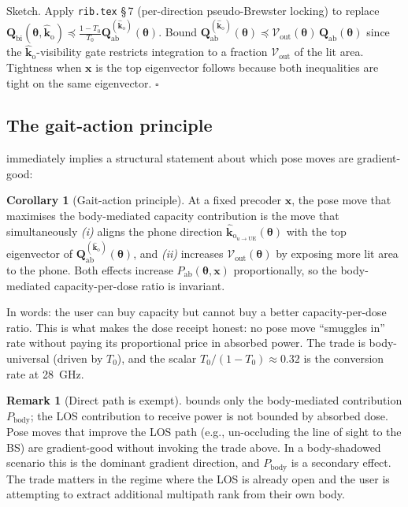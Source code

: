 \documentclass[11pt,a4paper]{article}
\theoremstyle{definition}
\newtheorem{corollary}[corollary]{Corollary}
\newtheorem{remark}[remark]{Remark}
\newcommand{\Qabs}{\mathbf{Q}_{\mathrm{ab}}}
\newcommand{\kout}{\hat{\bm{k}}_{\mathrm{o}}}
\newcommand{\Qbist}{\mathbf{Q}_{\mathrm{bi}}}
\newcommand{\xvec}{\mathbf{x}}
\newcommand{\thetab}{\bm{\theta}}
\begin{document}
\noindent Sketch.  Apply \texttt{rib.tex} \S\,7 (per-direction
pseudo-Brewster locking) to replace
$\Qbist(\thetab,\kout)\preceq \frac{1-T_0}{T_0}\Qabs^{(\kout)}(\thetab)$.
Bound $\Qabs^{(\kout)}(\thetab)\preceq
\mathcal{V}_{\mathrm{out}}(\thetab)\,\Qabs(\thetab)$ since the
$\kout$-visibility gate restricts integration to a fraction
$\mathcal{V}_{\mathrm{out}}$ of the lit area.  Tightness when $\xvec$
is the top eigenvector follows because both inequalities are tight
on the same eigenvector.  $\square$

\subsection{The gait-action principle}

 immediately implies a structural statement about
which pose moves are gradient-good:

\begin{corollary}[Gait-action principle]\label{cor:gait}
At a fixed precoder $\xvec$, the pose move that maximises the
body-mediated capacity contribution is the move that simultaneously
\emph{(i)} aligns the phone direction $\kout_{u\to\mathrm{UE}}(\thetab)$
with the top eigenvector of $\Qabs^{(\kout)}(\thetab)$, and
\emph{(ii)} increases $\mathcal{V}_{\mathrm{out}}(\thetab)$ by
exposing more lit area to the phone.  Both effects increase
$P_{\mathrm{ab}}(\thetab,\xvec)$ proportionally, so the body-mediated
capacity-per-dose ratio is invariant.
\end{corollary}

In words: the user can buy capacity but cannot buy a better
capacity-per-dose ratio.  This is what makes the dose receipt honest:
no pose move ``smuggles in'' rate without paying its proportional
price in absorbed power.  The trade is body-universal (driven by
$T_0$), and the scalar $T_0/(1-T_0)\approx 0.32$ is the conversion
rate at \SI{28}{GHz}.

\begin{remark}[Direct path is exempt]\label{rem:los-exempt}
 bounds only the body-mediated contribution
$P_{\mathrm{body}}$; the LOS contribution to receive power is not
bounded by absorbed dose.  Pose moves that improve the LOS path
(e.g., un-occluding the line of sight to the BS) are gradient-good
without invoking the trade above.  In a body-shadowed scenario this
is the dominant gradient direction, and $P_{\mathrm{body}}$ is a
secondary effect.  The trade matters in the regime where the LOS is
already open and the user is attempting to extract additional
multipath rank from their own body.
\end{remark}
\end{document}
